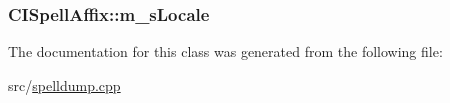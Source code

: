 \hypertarget{classCISpellAffix_a87aff15842799a09bd26767eac8abf30}{
\subsubsection[{m\-\_\-s\-Locale}]{ C\-I\-Spell\-Affix\-::m\-\_\-s\-Locale\hspace{0.3cm}{\ttfamily [private]}}}\label{classCISpellAffix_a87aff15842799a09bd26767eac8abf30}


The documentation for this class was generated from the following file\-:\begin{DoxyCompactItemize}
\item 
src/\hyperlink{spelldump_8cpp}{spelldump.\-cpp}\end{DoxyCompactItemize}

